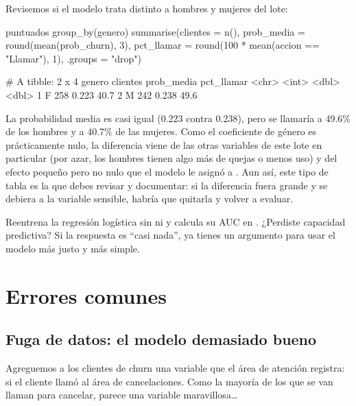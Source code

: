 Revisemos si el modelo trata distinto a hombres y mujeres del lote:

\begin{rcode}
puntuados %
  group_by(genero) %
  summarise(clientes = n(),
            prob_media = round(mean(prob_churn), 3),
            pct_llamar = round(100 * mean(accion == "Llamar"), 1),
            .groups = "drop")
\end{rcode}

\begin{rsalida}
# A tibble: 2 x 4
  genero clientes prob_media pct_llamar
  <chr>     <int>      <dbl>      <dbl>
1 F           258      0.223       40.7
2 M           242      0.238       49.6
\end{rsalida}

La probabilidad media es casi igual (0.223 contra 0.238), pero se llamaría a
49.6\% de los hombres y a 40.7\% de las mujeres. Como el coeficiente de género
es prácticamente nulo, la diferencia viene de las otras variables de este lote
en particular (por azar, los hombres tienen algo más de quejas o menos uso) y
del efecto pequeño pero no nulo que el modelo le asignó a
. Aun así, este tipo de tabla es la que debes revisar y
documentar: si la diferencia fuera grande y se debiera a la variable
sensible, habría que quitarla y volver a evaluar.

\begin{hazlotu}
Reentrena la regresión logística sin  ni  y
calcula su AUC en . ¿Perdiste capacidad predictiva? Si la
respuesta es ``casi nada'', ya tienes un argumento para usar el modelo más
justo y más simple.
\end{hazlotu}

\section{Errores comunes}
\label{sec:m7-errores}

\subsection{Fuga de datos: el modelo demasiado bueno}

Agreguemos a los clientes de churn una variable que el área de atención
registra: si el cliente llamó al área de cancelaciones. Como la mayoría de los
que se van llaman para cancelar, parece una variable maravillosa\ldots

